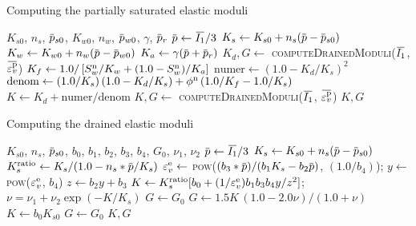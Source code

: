 \begin{breakablealgorithm}
  \caption{Computing the partially saturated elastic moduli}
  \begin{algorithmic}[1]
    \Require $K_{s0}$, $n_s$, $\pbar_{s0}$, $K_{w0}$, $n_w$, $\pbar_{w0}$, 
             $\gamma$, $\pbar_r$
        \State $\pbar \leftarrow \Ionebar/3$
        \State $K_s \leftarrow K_{s0} + n_s (\pbar - \pbar_{s0})$
        \State $K_w \leftarrow K_{w0} + n_w (\pbar - \pbar_{w0})$
        \State $K_a \leftarrow \gamma (\pbar + \pbar_r)$
        \State $K_d, G \leftarrow$ \textsc{computeDrainedModuli}($\Ionebar$, $\bar{\Veps^\Tp_v}$)
        \State $K_f \leftarrow 1.0/\left[S_w^{\text{n}}/K_w + (1.0-S_w^{\text{n}})/K_a\right]$
        \State $\text{numer} \leftarrow (1.0 - K_d/K_s)^2$
        \State $\text{denom} \leftarrow (1.0/K_s)\,(1.0 - K_d/K_s) + \phi^{\text{n}}\,(1.0/K_f - 1.0/K_s)$
        \State $K \leftarrow K_d + \text{numer}/\text{denom}$
      \Else
        \State $K, G \leftarrow$ \textsc{computeDrainedModuli}($\Ionebar$, $\bar{\Veps^\Tp_v}$)
      \EndIf
      \State \Return $K, G$
    \EndProcedure
  \end{algorithmic}
\end{breakablealgorithm}

\begin{breakablealgorithm}
  \caption{Computing the drained elastic moduli}
  \begin{algorithmic}[1]
    \Require $K_{s0}$, $n_s$, $\pbar_{s0}$, $b_0$, $b_1$, $b_2$, $b_3$, $b_4$, $G_0$, $\nu_1$, $\nu_2$
        \State $\pbar \leftarrow \Ionebar/3$
        \State $K_s \leftarrow K_{s0} + n_s (\pbar - \pbar_{s0})$
        \State $K_s^\Tratio \leftarrow K_s/(1.0 - n_s*\pbar/K_s)$
        \State $\varepsilon^{\text{e}}_v \leftarrow$ \textsc{pow}($(b_3*\pbar)/(b_1K_s - b_2\pbar)$, $(1.0/b_4)$);
        \State $y \leftarrow $ \textsc{pow}($\varepsilon^{\text{e}}_v$, $b_4$)
        \State $z \leftarrow b_2y + b_3$
        \State $K \leftarrow K_s^{\text{ratio}}[b_0 + (1/\varepsilon^{\text{e}}_v)b_1b_3b_4y/z^2]$;
        \State $\nu = \nu_1 + \nu_2\exp(-K/K_s)$
        \State $ G \leftarrow G_0$
          \State $G \leftarrow 1.5K\,(1.0-2.0\nu)/(1.0+\nu)$
        \EndIf
      \Else
        \State $K \leftarrow b_0K_{s0}$
        \State $G \leftarrow G_0$
      \EndIf
      \State \Return $K, G$
    \EndProcedure
  \end{algorithmic}
\end{breakablealgorithm}

